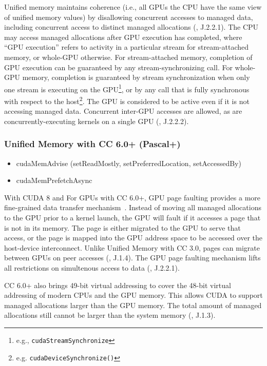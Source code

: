 Unified memory maintains coherence (i.e., all GPUs the CPU have the same view of unified memory values) by disallowing concurrent accesses to managed data, including concurrent access to distinct managed allocations (\cite{nvidia2014cuda60}, J.2.2.1).
The CPU may access managed allocations after GPU execution has completed, where ``GPU execution'' refers to activity in a particular stream for stream-attached memory, or whole-GPU otherwise.
For stream-attached memory, completion of GPU execution can be guaranteed by any stream-synchronizing call.
For whole-GPU memory, completion is guaranteed by stream synchronization when only one stream is executing on the GPU\footnote{e.g., \texttt{cudaStreamSynchronize}}, or by any call that is fully synchronous with respect to the host\footnote{e.g. \texttt{cudaDeviceSynchronize()}}.
The GPU is considered to be active even if it is not accessing managed data.
Concurrent inter-GPU accesses are allowed, as are concurrently-executing kernels on a single GPU (\cite{nvidia2014cuda60}, J.2.2.2).


\subsubsection{Unified Memory with CC 6.0+ (Pascal+)}

\begin{itemize}
	\item cudaMemAdvise (setReadMostly, setPreferredLocation, setAccessedBy)
	\item cudaMemPrefetchAsync
\end{itemize}

With CUDA 8 and For GPUs with CC 6.0+, GPU page faulting provides a more fine-grained data transfer mechanism~\cite{nvidia2017cuda80}.
Instead of moving all managed allocations to the GPU prior to a kernel launch, the GPU will fault if it accesses a page that is not in its memory.
The page is either migrated to the GPU to serve that access, or the page is mapped into the GPU address space to be accessed over the host-device interconnect.
Unlike Unified Memory with CC 3.0, pages can migrate between GPUs on peer accesses (\cite{nvidia2017cuda80}, J.1.4).
The GPU page faulting mechanism lifts all restrictions on simultenous access to data (\cite{nvidia2017cuda80}, J.2.2.1).

CC 6.0+ also brings 49-bit virtual addressing to cover the 48-bit virtual addressing of modern CPUs and the GPU memory.
This allows CUDA to support managed allocations larger than the GPU memory.
The total amount of managed allocations still cannot be larger than the system memory (\cite{nvidia2017cuda80}, J.1.3).

